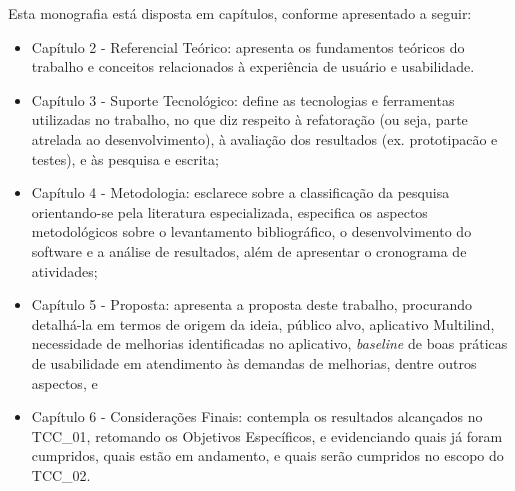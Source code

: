 \begin{description}
    \item Esta monografia está disposta em capítulos, conforme apresentado a seguir:
          \begin{itemize}
              \item Capítulo 2 - Referencial Teórico: apresenta os fundamentos teóricos do trabalho e conceitos relacionados à experiência de usuário e usabilidade.

              \item Capítulo 3 - Suporte Tecnológico: define as tecnologias e ferramentas utilizadas no trabalho, no que diz respeito à refatoração (ou seja, parte
              atrelada ao desenvolvimento), à avaliação dos resultados (ex. prototipacão e testes), e às pesquisa e escrita;

              \item Capítulo 4 - Metodologia: esclarece sobre a classificação da pesquisa orientando-se pela literatura especializada, especifica os aspectos
              metodológicos sobre o levantamento bibliográfico, o desenvolvimento do software e a análise de resultados, além de apresentar o cronograma de atividades;

              \item Capítulo 5 - Proposta: apresenta a proposta deste trabalho, procurando detalhá-la em termos de origem da ideia, público alvo, aplicativo Multilind,
              necessidade de melhorias identificadas no aplicativo, \textit{baseline} de boas práticas de usabilidade em atendimento às demandas de melhorias, dentre
              outros aspectos, e

              \item Capítulo 6 - Considerações Finais: contempla os resultados alcançados no TCC\_01, retomando os Objetivos Específicos, e evidenciando quais já foram
              cumpridos, quais estão em andamento, e quais serão cumpridos no escopo do TCC\_02.
          \end{itemize}
\end{description}